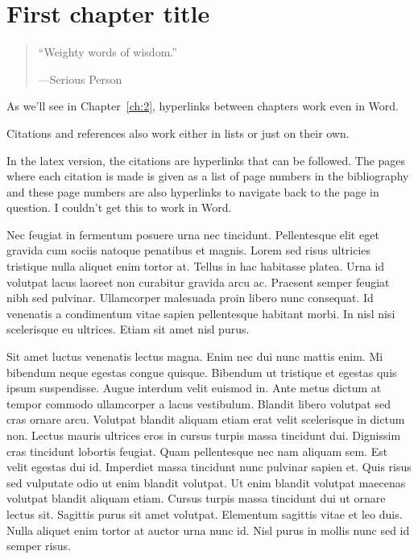 
\chapter{First chapter title} \label{ch:1}

\begin{quote}
``Weighty words of wisdom.''
\begin{flushright}---Serious Person \end{flushright}
\end{quote}

As we'll see in Chapter~\ref{ch:2}, hyperlinks between chapters work even in Word.

Citations and references also work either in lists\cite{Atzeni,fouquet2006seven,langmuir1928oscillations} or just on their own.\cite{MetropolisHastings}

In the latex version, the citations are hyperlinks that can be followed. The pages where each citation is made is given as a list of page numbers in the bibliography and these page numbers are also hyperlinks to navigate back to the page in question. I couldn't get this to work in Word.

Nec feugiat in fermentum posuere urna nec tincidunt. Pellentesque elit eget gravida cum sociis natoque penatibus et magnis. Lorem sed risus ultricies tristique nulla aliquet enim tortor at. Tellus in hac habitasse platea. Urna id volutpat lacus laoreet non curabitur gravida arcu ac. Praesent semper feugiat nibh sed pulvinar. Ullamcorper malesuada proin libero nunc consequat. Id venenatis a condimentum vitae sapien pellentesque habitant morbi. In nisl nisi scelerisque eu ultrices. Etiam sit amet nisl purus.

Sit amet luctus venenatis lectus magna. Enim nec dui nunc mattis enim. Mi bibendum neque egestas congue quisque. Bibendum ut tristique et egestas quis ipsum suspendisse. Augue interdum velit euismod in. Ante metus dictum at tempor commodo ullamcorper a lacus vestibulum. Blandit libero volutpat sed cras ornare arcu. Volutpat blandit aliquam etiam erat velit scelerisque in dictum non. Lectus mauris ultrices eros in cursus turpis massa tincidunt dui. Dignissim cras tincidunt lobortis feugiat. Quam pellentesque nec nam aliquam sem. Est velit egestas dui id. Imperdiet massa tincidunt nunc pulvinar sapien et. Quis risus sed vulputate odio ut enim blandit volutpat. Ut enim blandit volutpat maecenas volutpat blandit aliquam etiam. Cursus turpis massa tincidunt dui ut ornare lectus sit. Sagittis purus sit amet volutpat. Elementum sagittis vitae et leo duis. Nulla aliquet enim tortor at auctor urna nunc id. Nisl purus in mollis nunc sed id semper risus.

